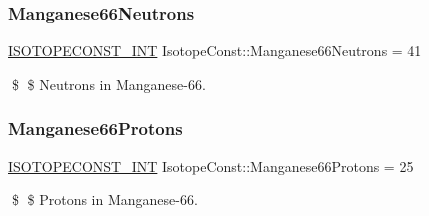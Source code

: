\subsubsection{\texorpdfstring{Manganese66\+Neutrons}{Manganese66Neutrons}}
{\footnotesize\ttfamily \mbox{\hyperlink{group___isotope_const-_macros_ga5f18360b3e99483a35c32d789e62621c}{I\+S\+O\+T\+O\+P\+E\+C\+O\+N\+S\+T\+\_\+\+I\+NT}} Isotope\+Const\+::\+Manganese66\+Neutrons = 41}

\$ \$ Neutrons in Manganese-\/66. \mbox{\label{group___isotope_const-_manganese-_mn66_ga59be2ac63a4f5bd6c90a67d76b6430f9}} 
\subsubsection{\texorpdfstring{Manganese66\+Protons}{Manganese66Protons}}
{\footnotesize\ttfamily \mbox{\hyperlink{group___isotope_const-_macros_ga5f18360b3e99483a35c32d789e62621c}{I\+S\+O\+T\+O\+P\+E\+C\+O\+N\+S\+T\+\_\+\+I\+NT}} Isotope\+Const\+::\+Manganese66\+Protons = 25}

\$ \$ Protons in Manganese-\/66. 